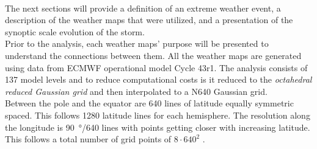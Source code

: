 \\
The next sections will provide a definition of an extreme weather event, a description of the weather maps that were utilized, and a presentation of the synoptic scale evolution of the storm. \\
Prior to the analysis, each weather maps' purpose  will be presented to understand the connections between them. All the weather maps are generated using data from ECMWF operational model Cycle {43r1}. The analysis consists of 137 model levels and to reduce computational costs is it reduced to the \textit{octahedral reduced Gaussian grid} and then interpolated to a N640 Gaussian grid. 
\\
Between the pole and the equator are 640 lines of latitude equally symmetric spaced. This follows 1280 latitude lines for each hemisphere. The resolution along the longitude is \SI{90}{\degree}/640 lines with points getting closer with increasing latitude. This follows a total number of grid points of $8 \cdot 640^2$ \citep{dando_introducing_2016}.



\newpage





\newpage








